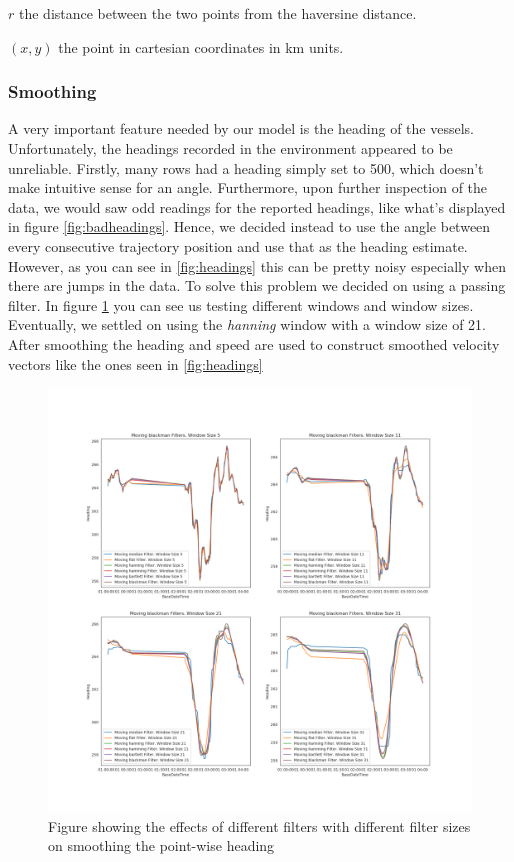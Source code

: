 \documentclass[bsc,frontabs,twoside,singlespacing,parskip,deptreport]{infthesis}     %
\begin{document}
\hspace{0.25in} $r$ the distance between the two points from the haversine distance.

\hspace{0.25in} $(x, y)$ the point in cartesian coordinates in km units.

\subsubsection{Smoothing}
\label{sss:smoothing}
A very important feature needed by our model is the heading of the vessels. Unfortunately, the headings recorded in the environment appeared to be unreliable. Firstly, many rows had a heading simply set to 500, which doesn't make intuitive sense for an angle. Furthermore, upon further inspection of the data, we would saw odd readings for the reported headings, like what's displayed in figure \ref{fig:badheadings}. Hence, we decided instead to use the angle between every consecutive trajectory position and use that as the heading estimate. However, as you can see in \ref{fig:headings} this can be pretty noisy especially when there are jumps in the data. To solve this problem we decided on using a passing filter. In figure \ref{fig:filters} you can see us testing different windows and window sizes. Eventually, we settled on using the \emph{hanning} window with a window size of 21. After smoothing the heading and speed are used to construct smoothed velocity vectors like the ones seen in \ref{fig:headings}

\begin{figure}
    \centering
    \includegraphics[width=\linewidth]{report/images/filters.png}
    \caption{Figure showing the effects of different filters with different filter sizes on smoothing the point-wise heading}
    \label{fig:filters}
\end{figure}
\end{document}

